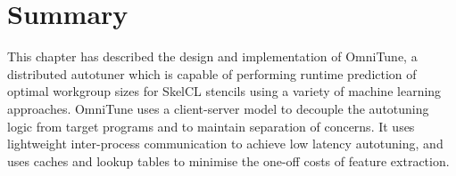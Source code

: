 





\section{Summary}

This chapter has described the design and implementation of OmniTune,
a distributed autotuner which is capable of performing runtime
prediction of optimal workgroup sizes for SkelCL stencils using a
variety of machine learning approaches. OmniTune uses a client-server
model to decouple the autotuning logic from target programs and to
maintain separation of concerns. It uses lightweight inter-process
communication to achieve low latency autotuning, and uses caches and
lookup tables to minimise the one-off costs of feature
extraction. 
